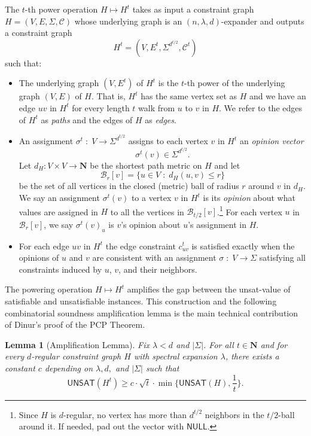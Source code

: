 \documentclass{article}
\newtheorem{lemma}[theorem]{Lemma}
\newcommand{\N}{{\mathbf N}}
\newcommand{\UNSAT}{\mathsf{UNSAT}}
\newcommand{\NULL}{\mathsf{NULL}}
\begin{document}
The $t$-th power operation $H \mapsto H^t$ takes as input a
constraint graph $H = (V, E, \Sigma, \mathcal{C})$ whose
underlying graph is an $(n, \lambda, d)$-expander and outputs a
constraint graph
$$
H^t = (V, E^t, \Sigma^{d^{t/2}}, \mathcal{C}^t)
$$
such that:
\begin{itemize}

\item
The underlying graph $(V, E^t)$ of $H^t$ is the $t$-th power of the
underlying graph $(V, E)$ of $H$.
That is, $H^t$ has the same vertex set as $H$ and we have an edge $uv$ in $H^t$
for every length $t$ walk from $u$ to $v$ in $H$.
We refer to the edges of $H^t$ as \emph{paths} and the edges of $H$ as \emph{edges}.

\item
An assignment $\sigma^t \;:\; V \to \Sigma^{d^{t/2}}$ assigns to each
vertex $v$ in $H^t$ an \emph{opinion vector}
$$
\sigma^t(v) \in \Sigma^{d^{t/2}}. 
$$
Let $d_H : V \times V \to \N$ be the shortest path metric on $H$
and let
$$
\mathcal{B}_r[v] = \{u \in V \;:\; d_H(u,v) \le r\}
$$
be the set of all vertices in the closed (metric) ball of radius $r$ around $v$ in $d_H$.
We say an assignment $\sigma^t(v)$ to a vertex $v$ in $H^t$ is its \emph{opinion}
about what values are assigned in $H$ to all the vertices in $\mathcal{B}_{t/2}[v]$.\footnote{
Since $H$ is $d$-regular, no vertex has more than $d^{t/2}$ neighbors in the
$t/2$-ball around it.  If needed, pad out the vector with $\NULL$.}
For each vertex $u$ in $\mathcal{B}_r[v]$, we say $\sigma^t(v)_u$ is
$v$'s opinion about $u$'s assignment in $H$. 

\item
For each edge $uv$ in $H^t$ the edge constraint $c_{uv}^t$ is satisfied
exactly when the opinions of $u$ and $v$ are consistent with an
assignment $\sigma \;:\; V \to \Sigma$ satisfying all constraints induced by
$u$, $v$, and their neighbors.

\end{itemize}

The powering operation $H \mapsto H^t$ amplifies the gap between the
unsat-value of satisfiable and unsatisfiable instances.
This construction and the following combinatorial soundness amplification lemma is the main
technical contribution of Dinur's proof of the PCP Theorem.

\begin{lemma}[Amplification Lemma]
Fix $\lambda < d$ and $|\Sigma|$.
For all $t \in \N$ and for every $d$-regular constraint graph $H$ with
spectral expansion $\lambda$, there exists a constant $c$ depending
on $\lambda, d,$ and $|\Sigma|$ such that
$$
\UNSAT(H^t) \ge c\cdot\sqrt{t}\cdot\min\{\UNSAT(H), \frac{1}{t}\}.
$$
\end{lemma}
\end{document}
